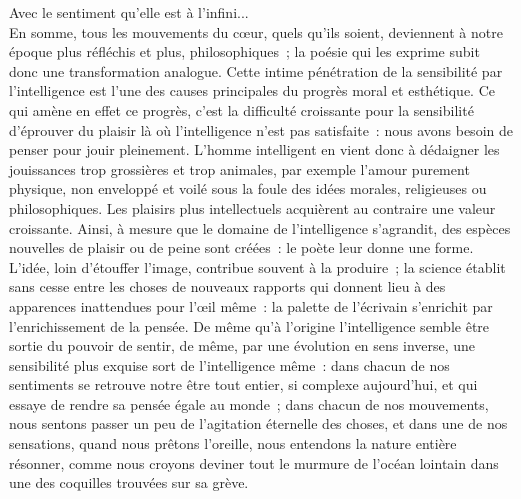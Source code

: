 \documentclass[french,twoside]{book} %
\begin{document}
Avec le sentiment qu’elle est à l’infini...\\

\noindent En somme, tous les mouvements du cœur, quels qu’ils soient, deviennent à notre époque plus réfléchis et plus, philosophiques ; la poésie qui les exprime subit donc une transformation analogue. Cette intime pénétration de la sensibilité par l’intelligence est l’une des causes principales du progrès moral et esthétique. Ce qui amène en  effet ce progrès, c’est la difficulté croissante pour la sensibilité d’éprouver du plaisir là où l’intelligence n’est pas satisfaite : nous avons besoin de penser pour jouir pleinement. L’homme intelligent en vient donc à dédaigner les jouissances trop grossières et trop animales, par exemple l’amour purement physique, non enveloppé et voilé sous la foule des idées morales, religieuses ou philosophiques. Les plaisirs plus intellectuels acquièrent au contraire une valeur croissante. Ainsi, à mesure que le domaine de l’intelligence s’agrandit, des espèces nouvelles de plaisir ou de peine sont créées : le poète leur donne une forme. L’idée, loin d’étouffer l’image, contribue souvent à la produire ; la science établit sans cesse entre les choses de nouveaux rapports qui donnent lieu à des apparences inattendues pour l’œil même : la palette de l’écrivain s’enrichit par l’enrichissement de la pensée. De même qu’à l’origine l’intelligence semble être sortie du pouvoir de sentir, de même, par une évolution en sens inverse, une sensibilité plus exquise sort de l’intelligence même : dans chacun de nos sentiments se retrouve notre être tout entier, si complexe aujourd’hui, et qui essaye de rendre sa pensée égale au monde ; dans chacun de nos mouvements, nous sentons passer un peu de l’agitation éternelle des choses, et dans une de nos sensations, quand nous prêtons l’oreille, nous entendons la nature entière résonner, comme nous croyons deviner tout le murmure de l’océan lointain dans une des coquilles trouvées sur sa grève.
\end{document}

